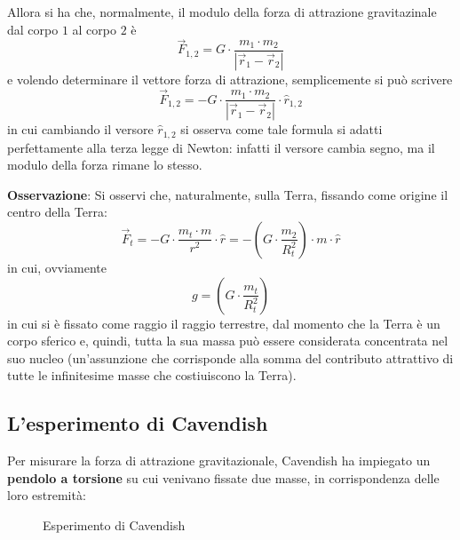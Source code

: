\documentclass[a4paper]{extarticle}
\begin{document}
\vspace{1em}
\noindent
Allora si ha che, normalmente, il modulo della forza di attrazione gravitazinale dal corpo $1$ al corpo $2$ è
\[\vec F_{1,2} = G \cdot \frac{m_1 \cdot m_2}{\left \vert \vec r_1 - \vec r_2 \right \vert}\]
e volendo determinare il vettore forza di attrazione, semplicemente si può scrivere
\[\boxed{\vec F_{1,2} = -G \cdot \frac{m_1 \cdot m_2}{\left \vert \vec r_1 - \vec r_2 \right \vert} \cdot \hat{r}_{1,2}}\]
in cui cambiando il versore $\hat{r}_{1,2}$ si osserva come tale formula si adatti perfettamente alla terza legge di Newton: infatti il versore cambia segno, ma il modulo della forza rimane lo stesso.

\vspace{1em}
\noindent
\textbf{Osservazione}: Si osservi che, naturalmente, sulla Terra, fissando come origine il centro della Terra:
\[\vec{F}_t = -G \cdot \frac{m_t \cdot m}{r^2} \cdot \hat{r} = - \left(G \cdot \frac{m_2}{R_t^2}\right) \cdot m \cdot \hat{r}\]
in cui, ovviamente
\[g = \left(G \cdot \frac{m_t}{R_t^2}\right)\]
in cui si è fissato come raggio il raggio terrestre, dal momento che la Terra è un corpo sferico e, quindi, tutta la sua massa può essere considerata concentrata nel suo nucleo (un'assunzione che corrisponde alla somma del contributo attrattivo di tutte le infinitesime masse che costiuiscono la Terra).

\vspace{1em}
\subsection{L'esperimento di Cavendish}
Per misurare la forza di attrazione gravitazionale, Cavendish ha impiegato un \textbf{pendolo a torsione} su cui venivano fissate due masse, in corrispondenza delle loro estremità:

\begin{figure}[H]
  \centering
  \caption{Esperimento di Cavendish}
  \label{fig:esperimento_cavendish}
\end{figure}
\end{document}

